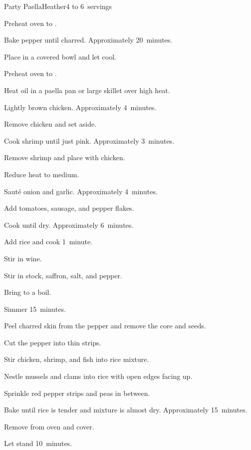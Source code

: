 \begin{recipe}{Party Paella}{Heather}{4 to 6~servings}
\begin{directions}
\item Preheat oven to .
\item Bake pepper until charred. Approximately 20~minutes.
\item Place in a covered bowl and let cool.
\item Preheat oven to .
\item Heat  oil in a paella pan or large skillet over high heat.
\item Lightly brown chicken. Approximately 4~minutes.
\item Remove chicken and set aside.
\item Cook shrimp until just pink. Approximately 3~minutes.
\item Remove shrimp and place with chicken.
\item Reduce heat to medium.
\item Saut\'e onion and garlic. Approximately 4~minutes.
\item Add tomatoes, sausage, and pepper flakes.
\item Cook until dry. Approximately 6~minutes.
\item Add rice and cook 1~minute.
\item Stir in wine.
\item Stir in stock, saffron, salt, and pepper.
\item Bring to a boil.
\item Simmer 15~minutes.
\item Peel charred skin from the pepper and remove the core and seeds.
\item Cut the pepper into thin strips.
\item Stir chicken, shrimp, and fish into rice mixture.
\item Nestle mussels and clams into rice with open edges facing up.
\item Sprinkle red pepper strips and peas in between.
\item Bake until rice is tender and mixture is almost dry. Approximately 15~minutes.
\item Remove from oven and cover.
\item Let stand 10~minutes.
\end{directions}

\hint{}
\end{recipe}
